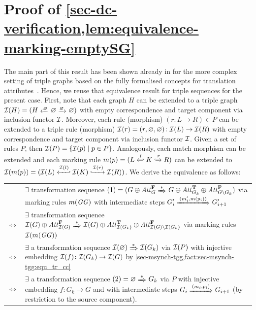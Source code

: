 \section{Proof of \cref{sec-dc-verification,lem:equivalence-marking-emptySG}}
\label{sec-proofs:lem:equivalence-marking-emptySG}
The main part of this result has been shown already in \cite{heocdx11} for the more complex setting of triple graphs based on the fully formalised
concepts for translation attributes~\cite{Hermann:2010:EAE:1866272.1866277}.
Hence, we reuse that equivalence result for triple sequences for the present case.
First, note that each graph $H$ can be extended to a triple graph 
$\I(H)=(H \transB{\varnothing} \varnothing \trans{\varnothing} \varnothing)$ with empty correspondence and target component
via inclusion functor ${\cal I}$.
Moreover, each rule (morphism) $(r\colon L\to R) \in P$ can be extended to a triple rule (morphism) 
${\cal I}(r)=(r,\varnothing,\varnothing)\colon {\cal I}(L) \to {\cal I}(R)$ 
with empty correspondence and target component via inclusion functor ${\cal I}$.
Given a set of rules $P$, then ${\cal I}(P) = \{{\cal I}(p) \mid p \in P\}$.
Analogously, each match morphism can be extended and each marking rule $m(p)=(L \xhookleftarrow{l} K \xhookrightarrow{r} R)$ can be extended to $\I(m(p))=(\I(L) \xhookleftarrow{\I(l)} \I(K) \xhookrightarrow{\I(r)} \I(R))$.
We derive the equivalence as follows:
\\
\begin{tabular}{lp{}}
& $\exists$ transformation sequence	$(1)=(G \oplus \Att_G^\False \Trans{*} G \oplus \Att_{G_k}^\True \oplus \Att_{G \setminus G_k}^\False)$ via marking rules $m(\mathit{GG})$ with intermediate steps $G'_i \Trans{(m'_i,m(p_i))} G'_{i+1}$ %
\\
$\Leftrightarrow$
& $\exists$ transformation sequence $\I(G) \oplus \Att_{\I(G)}^\False \Trans{*} \I(G) \oplus \Att_{\I(G_k)}^\True \oplus \Att_{\I(G) \setminus \I(G_k)}^\False$ via marking rules ${\cal I}(m(\mathit{GG}))$ %
\\
$\Leftrightarrow$
&
	$\exists$ a transformation sequence $\I(\varnothing) \Trans{*} \I(G_k)$ via ${\cal I}(P)$ with injective embedding ${\cal I}(f)\colon {\cal I}(G_k) \to {\cal I}(G)$ by \cref{sec-msynch-tgg,fact:sec-msynch-tgg:equ_tr_cc}
\\
$\Leftrightarrow$
&
	$\exists$ a transformation sequence $(2)=\varnothing \Trans{*} G_k$ via $P$ with injective embedding $f\colon G_k \to G$ and with intermediate steps $G_i \Trans{(m_i,p_i)} G_{i+1}$ (by restriction to the source component).
\end{tabular}

